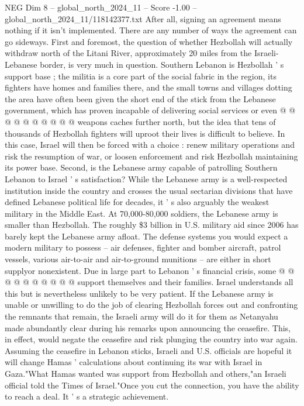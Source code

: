 \begin{textsample}{NEG Dim 8 – global\_north\_2024\_11 – Score -1.00 – global\_north\_2024\_11/118142377.txt}
After all, signing an agreement means nothing if it isn't implemented.
There are any number of ways the agreement can go sideways.
First and foremost, the question of whether Hezbollah will actually withdraw north of the Litani River, approximately 20 miles from the Israeli-Lebanese border, is very much in question.
Southern Lebanon is Hezbollah ' s support base ; the militia is a core part of the social fabric in the region, its fighters have homes and families there, and the small towns and villages dotting the area have often been given the short end of the stick from the Lebanese government, which has proven incapable of delivering social services or even @ @ @ @ @ @ @ @ @ @ weapons caches further north, but the idea that tens of thousands of Hezbollah fighters will uproot their lives is difficult to believe.
In this case, Israel will then be forced with a choice : renew military operations and risk the resumption of war, or loosen enforcement and risk Hezbollah maintaining its power base.
Second, is the Lebanese army capable of patrolling Southern Lebanon to Israel ' s satisfaction?
While the Lebanese army is a well-respected institution inside the country and crosses the usual sectarian divisions that have defined Lebanese political life for decades, it ' s also arguably the weakest military in the Middle East.
At 70,000-80,000 soldiers, the Lebanese army is smaller than Hezbollah.
The roughly \$3 billion in U.S. military aid since 2006 has barely kept the Lebanese army afloat.
The defense systems you would expect a modern military to possess -- air defenses, fighter and bomber aircraft, patrol vessels, various air-to-air and air-to-ground munitions -- are either in short supplyor nonexistent.
Due in large part to Lebanon ' s financial crisis, some @ @ @ @ @ @ @ @ @ @ support themselves and their families.
Israel understands all this but is nevertheless unlikely to be very patient.
If the Lebanese army is unable or unwilling to do the job of clearing Hezbollah forces out and confronting the remnants that remain, the Israeli army will do it for them as Netanyahu made abundantly clear during his remarks upon announcing the ceasefire.
This, in effect, would negate the ceasefire and risk plunging the country into war again.
Assuming the ceasefire in Lebanon sticks, Israeli and U.S. officials are hopeful it will change Hamas ' calculations about continuing its war with Israel in Gaza."What Hamas wanted was support from Hezbollah and others,"an Israeli official told the Times of Israel."Once you cut the connection, you have the ability to reach a deal.
It ' s a strategic achievement.

\end{textsample}

